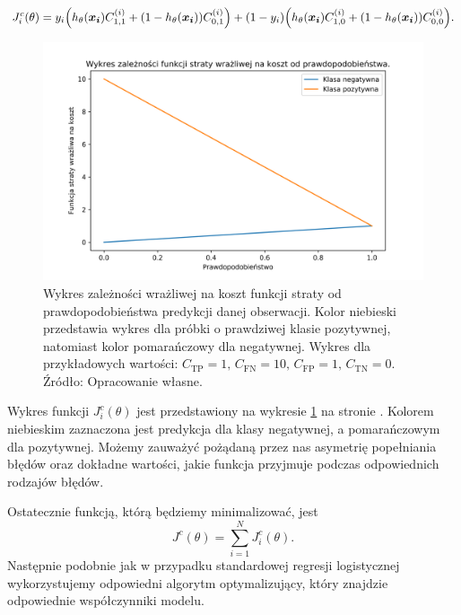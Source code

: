 \documentclass[inzynierska]{pwr_wmat_praca_dyplomowa}
\theoremstyle{plain}
\numberwithin{theorem}{chapter}
\theoremstyle{definition}
\numberwithin{theorem}{chapter}
\begin{document}
$$ J^c_i(\theta) = y_i \Big( h_{\theta}(\boldsymbol{x_i}) C^{(i)}_{1,1} + (1 - h_{\theta}(\boldsymbol{x_i}))C^{(i)}_{0,1} \Big) + (1-y_i) \Big( h_{\theta}(\boldsymbol{x_i}) C^{(i)}_{1,0} + (1 - h_{\theta}(\boldsymbol{x_i}))C^{(i)}_{0,0} \Big) \text{.} $$


\begin{figure}[h]
	\includegraphics[width=\linewidth]{images/cost_sensitive_ce.png}
	\caption{Wykres zależności wrażliwej na koszt funkcji straty od prawdopodobieństwa predykcji danej obserwacji. Kolor niebieski przedstawia wykres dla próbki o prawdziwej klasie pozytywnej, natomiast kolor pomarańczowy dla negatywnej. Wykres dla przykładowych wartości: $C_{\text{TP}} = 1 \text{, } C_{\text{FN}} = 10 \text{, } C_{\text{FP}} = 1 \text{, } C_{\text{TN}} = 0$. Źródło: Opracowanie własne.}
	\label{fig:cost-sensitive-loss-function}
\end{figure}

Wykres funkcji $J^c_i(\theta)$ jest przedstawiony na wykresie \ref{fig:cost-sensitive-loss-function} na stronie \pageref{fig:cost-sensitive-loss-function}. Kolorem niebieskim zaznaczona jest predykcja dla klasy negatywnej, a pomarańczowym dla pozytywnej. Możemy zauważyć pożądaną przez nas asymetrię popełniania błędów oraz dokładne wartości, jakie funkcja przyjmuje podczas odpowiednich rodzajów błędów.

Ostatecznie funkcją, którą będziemy minimalizować, jest 
$$ J^c(\theta) = \sum_{i=1}^{N} J^c_i(\theta) \text{.} $$
Następnie podobnie jak w przypadku standardowej regresji logistycznej wykorzystujemy odpowiedni algorytm optymalizujący, który znajdzie odpowiednie współczynniki modelu.
\end{document}
